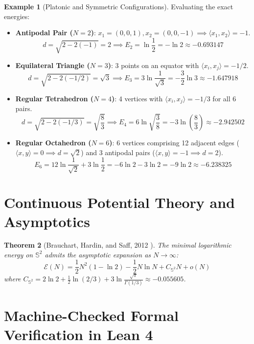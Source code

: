 \documentclass[11pt,a4paper]{article}
\newtheorem{theorem}{Theorem}[section]
\theoremstyle{definition}
\newtheorem{example}[theorem]{Example}
\begin{document}
\begin{example}[Platonic and Symmetric Configurations]\label{ex:platonic_energies}
Evaluating the exact energies:
\begin{itemize}
    \item \textbf{Antipodal Pair ($N = 2$)}: $x_1 = (0, 0, 1), x_2 = (0, 0, -1) \implies \langle x_1, x_2 \rangle = -1$.
    \[ d = \sqrt{2 - 2(-1)} = 2 \implies E_2 = \ln \frac{1}{2} = -\ln 2 \approx -0.693147 \]
    \item \textbf{Equilateral Triangle ($N = 3$)}: 3 points on an equator with $\langle x_i, x_j \rangle = -1/2$.
    \[ d = \sqrt{2 - 2(-1/2)} = \sqrt{3} \implies E_3 = 3 \ln \frac{1}{\sqrt{3}} = -\frac{3}{2} \ln 3 \approx -1.647918 \]
    \item \textbf{Regular Tetrahedron ($N = 4$)}: 4 vertices with $\langle x_i, x_j \rangle = -1/3$ for all 6 pairs.
    \[ d = \sqrt{2 - 2(-1/3)} = \sqrt{\frac{8}{3}} \implies E_4 = 6 \ln \sqrt{\frac{3}{8}} = -3 \ln \left( \frac{8}{3} \right) \approx -2.942502 \]
    \item \textbf{Regular Octahedron ($N = 6$)}: 6 vertices comprising 12 adjacent edges ($\langle x, y \rangle = 0 \implies d = \sqrt{2}$) and 3 antipodal pairs ($\langle x, y \rangle = -1 \implies d = 2$).
    \[ E_6 = 12 \ln \frac{1}{\sqrt{2}} + 3 \ln \frac{1}{2} = -6 \ln 2 - 3 \ln 2 = -9 \ln 2 \approx -6.238325 \]
\end{itemize}
\end{example}

\section{Continuous Potential Theory and Asymptotics}

\begin{theorem}[Brauchart, Hardin, and Saff, 2012 \cite{brauchart2012}]\label{thm:bhs_asymptotics}
The minimal logarithmic energy on $\mathbb{S}^2$ admits the asymptotic expansion as $N \to \infty$:
\begin{equation}\label{eq:energy_asymptotics}
\mathcal{E}(N) = \frac{1}{2} N^2 (1 - \ln 2) - \frac{1}{2} N \ln N + C_{\mathbb{S}^2} N + o(N)
\end{equation}
where $C_{\mathbb{S}^2} = 2\ln 2 + \frac{1}{2} \ln(2/3) + 3\ln \frac{\sqrt{\pi}}{\Gamma(1/3)} \approx -0.055605$.
\end{theorem}

\section{Machine-Checked Formal Verification in Lean 4}
\end{document}
